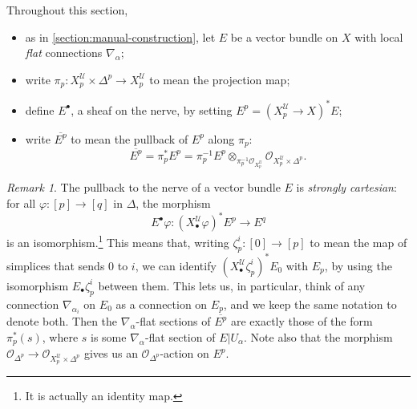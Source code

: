 \documentclass[11pt,fleqn]{article}
\theoremstyle{plain}
\theoremstyle{definition}
\theoremstyle{remark}
\newtheorem{remark}[theorem]{Remark}
\numberwithin{equation}{theorem}
\newcommand{\cover}{\mathcal{U}}
\newcommand{\OO}{\mathcal{O}}
\newcommand{\restricted}{\mathbin{\big\vert}}
\newcommand{\nerve}[1]{X_{#1}^\cover}
\begin{document}
        Throughout this section,
        \begin{itemize}
            \item as in \cref{section:manual-construction}, let $E$ be a vector bundle on $X$ with local \emph{flat} connections $\nabla_\alpha$;
            \item write $\pi_p\colon\nerve{p}\times\Delta^p\to\nerve{p}$ to mean the projection map;
            \item define $E^\bullet$, a sheaf on the nerve, by setting $E^p=(\nerve{p}\to X)^*E$;
            \item write $\overline{E^p}$ to mean the pullback of $E^p$ along $\pi_p$:
                \[
                    \overline{E^p}
                    =
                    \pi_p^* E^p
                    =
                    \pi_p^{-1} E^p \otimes_{\pi_p^{-1}\OO_{\nerve{p}}} \OO_{\nerve{p}\times\Delta^p}.
                \]
        \end{itemize}

        \begin{remark}
            The pullback to the nerve of a vector bundle $E$ is \emph{strongly cartesian}: for all $\varphi\colon[p]\to[q]$ in $\Delta$, the morphism
            \[
                E^\bullet\varphi\colon
                \left(\nerve{\bullet}\varphi\right)^* E^p
                \longrightarrow
                E^q
            \]
            is an isomorphism.\footnote{It is actually an identity map.}
            This means that, writing $\zeta_p^i\colon[0]\to[p]$ to mean the map of simplices that sends $0$ to $i$, we can identify $(\nerve{\bullet}\zeta_p^i)^* E_0$ with $E_p$, by using the isomorphism $E_\bullet\zeta_p^i$ between them.
            This lets us, in particular, think of any connection $\nabla_{\alpha_i}$ on $E_0$ as a connection on $E_p$, and we keep the same notation to denote both.
            Then the $\nabla_\alpha$-flat sections of $\overline{E^p}$ are exactly those of the form $\pi_p^*(s)$, where $s$ is some $\nabla_\alpha$-flat section of $E\restricted U_\alpha$.
            Note also that the morphism $\OO_{\Delta^p}\to\OO_{\nerve{p}\times\Delta^p}$ gives us an $\OO_{\Delta^p}$-action on $E^p$.
        \end{remark}
\end{document}
